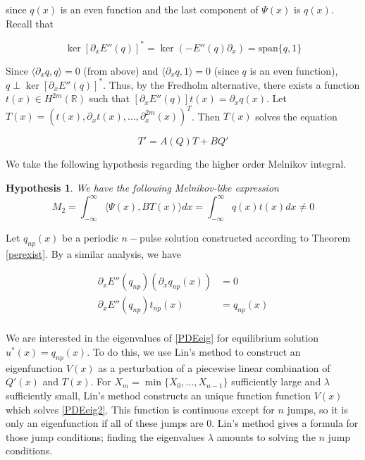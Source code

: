 \documentclass[12pt]{article}
\def\R{{\mathbb R}}
\newtheorem{hypothesis}{Hypothesis}
\begin{document}
since $q(x)$ is an even function and the last component of $\Psi(x)$ is $q(x)$. Recall that 

\[
\ker [\partial_x E''(q)]^* = \ker(-E''(q) \partial_x) = 
\text{span}\{ q, 1 \}
\]

Since $\langle \partial_x q, q \rangle = 0$ (from above) and $\langle \partial_x q, 1 \rangle = 0$ (since $q$ is an even function), $q \perp \ker [\partial_x E''(q)]^*$. Thus, by the Fredholm alternative, there exists a function $t(x) \in H^{2m}(\R)$ such that $[ \partial_x E''(q) ]t(x) = \partial_x q(x)$. Let $T(x) = (t(x), \partial_x t(x), \dots, \partial_x^{2m}(x))^T$. Then $T(x)$ solves the equation

\begin{equation}\label{eqforT}
T' = A(Q)T + B Q'
\end{equation}

We take the following hypothesis regarding the higher order Melnikov integral.

\begin{hypothesis}\label{Melnikov2hyp}
We have the following Melnikov-like expression
\begin{equation}\label{M2}
M_2 = \int_{-\infty}^\infty \langle \Psi(x), B T(x) \rangle dx =
\int_{-\infty}^\infty q(x) t(x) dx \neq 0
\end{equation}
\end{hypothesis}

Let $q_{np}(x)$ be a periodic $n-$pulse solution constructed according to Theorem \ref{perexist}. By a similar analysis, we have

\begin{align*}
\partial_x E''(q_{np}) (\partial_x q_{np}(x)) &= 0 \\
\partial_x E''(q_{np}) t_{np}(x) &= q_{np}(x) \\
\end{align*}

We are interested in the eigenvalues of \eqref{PDEeig} for equilibrium solution $u^*(x) = q_{np}(x)$. To do this, we use Lin's method to construct an eigenfunction $V(x)$ as a perturbation of a piecewise linear combination of $Q'(x)$ and $T(x)$. For $X_m = \min\{X_0, \dots, X_{n-1} \}$ sufficiently large and $\lambda$ sufficiently small, Lin's method constructs an unique function function $V(x)$ which solves \eqref{PDEeig2}. This function is continuous except for $n$ jumps, so it is only an eigenfunction if all of these jumps are 0. Lin's method gives a formula for those jump conditions; finding the eigenvalues $\lambda$ amounts to solving the $n$ jump conditions.\\
\end{document}
